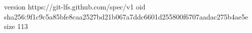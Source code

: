 version https://git-lfs.github.com/spec/v1
oid sha256:9f1c9c5a85bfe8caa2527bd21b067a7ddc6601d255800f6707aadac275b4ae5e
size 113
